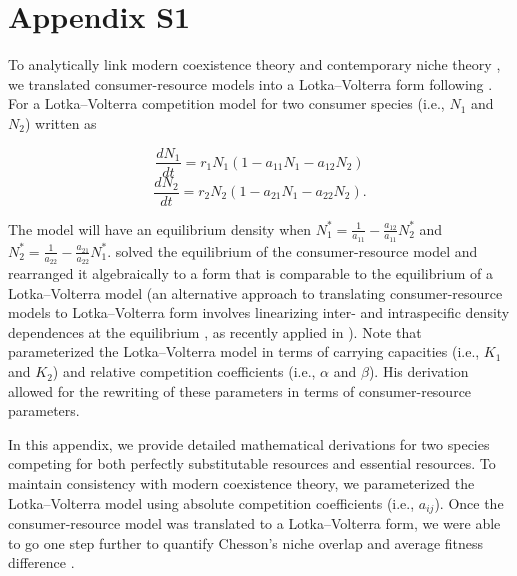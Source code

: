 \section{Appendix S1}
To analytically link modern coexistence theory \citep{Chesson2000} and contemporary niche theory \citep{Chase2003}, we translated consumer-resource models into a Lotka--Volterra form following \cite[Ch.~7]{tilman1982}. For a Lotka--Volterra competition model for two consumer species (i.e., $N_{1}$ and $N_{2}$) written as

\begin{equation}
\frac{dN_{1}}{dt}=r_{1}N_{1}\left ( 1-a_{11}N_{1}-a_{12}N_{2} \right ) 
\tag{S2.1.1}\label{eq:S2.1.1}
\end{equation}
\begin{equation}
\frac{dN_{2}}{dt}=r_{2}N_{2}\left ( 1-a_{21}N_{1}-a_{22}N_{2} \right ). 
\tag{S2.1.2}\label{eq:S2.1.2}
\end{equation}

\noindent The model will have an equilibrium density when $N_{1}^{*}=\frac{1}{a_{11}}-\frac{a_{12}}{a_{11}}N_{2}^{*}$ and $N_{2}^{*}=\frac{1}{a_{22}}-\frac{a_{21}}{a_{22}}N_{1}^{*}$. \cite{tilman1982} solved the equilibrium of the consumer-resource model and rearranged it algebraically to a form that is comparable to the equilibrium of a Lotka--Volterra model (an alternative approach to translating consumer-resource models to Lotka--Volterra form involves linearizing inter- and intraspecific density dependences at the equilibrium \citep{Meszenaz2006}, as recently applied in \cite{Kleinhesselink2015}). Note that \cite{tilman1982} parameterized the Lotka--Volterra model in terms of carrying capacities (i.e., $K_{1}$ and $K_{2}$) and relative competition coefficients (i.e., $\alpha$ and $\beta$). His derivation allowed for the rewriting of these parameters in terms of consumer-resource parameters. 
\par


In this appendix, we provide detailed mathematical derivations for two species competing for both perfectly substitutable resources and essential resources. To maintain consistency with modern coexistence theory, we parameterized the Lotka--Volterra model using absolute competition coefficients (i.e., $a_{ij}$). Once the consumer-resource model was translated to a Lotka--Volterra form, we were able to go one step further to quantify Chesson's niche overlap and average fitness difference \citep{Chesson2000, Godoy2014}. 
\par



